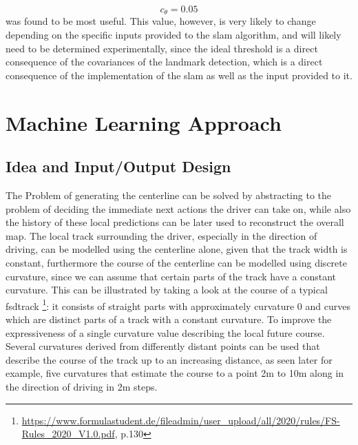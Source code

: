 $$c_\theta = 0.05$$
was found to be most useful. This value, however, is very likely to change depending on the specific inputs provided to the \ac{slam} algorithm, and will likely need to be determined experimentally, since the ideal threshold is a direct consequence of the covariances of the landmark detection, which is a direct consequence of the implementation of the \ac{slam} as well as the input provided to it.


\section{Machine Learning Approach}
\subsection{Idea and Input/Output Design}
The Problem of generating the centerline can be solved by abstracting to the problem of deciding the immediate next actions the driver can take on, while also the history of these local predictions can be later used to reconstruct the overall map. The local track surrounding the driver, especially in the direction of driving, can be modelled using the centerline alone, given that the track width is constant, furthermore the course of the centerline can be modelled using discrete curvature, since we can assume that certain parts of the track have a constant curvature. This can be illustrated by taking a look at the course of a typical \ac{fsd}track \footnote{\url{https://www.formulastudent.de/fileadmin/user_upload/all/2020/rules/FS-Rules_2020_V1.0.pdf}, p.130}: it consists of straight parts with approximately curvature 0 and curves which are distinct parts of a track with a constant curvature. To improve the expressiveness of a single curvature value describing the local future course. Several curvatures derived from differently distant points can be used that describe the course of the track up to an increasing distance, as seen later for example, five curvatures that estimate the course to a point 2m to 10m along in the direction of driving in 2m steps.


